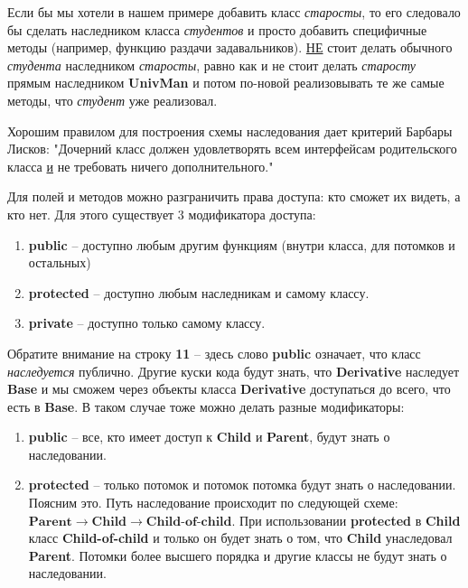 \begin{lecture}[\lectureSubject]
\begin{lecSection}
		Если бы мы хотели в нашем примере добавить класс \textit{старосты}, то его следовало бы сделать наследником класса \textit{студентов} и просто добавить специфичные методы (например, функцию раздачи задавальников). \underline{НЕ} стоит делать обычного \textit{студента} наследником \textit{старосты}, равно как и не стоит делать \textit{старосту} прямым наследником \textbf{UnivMan} и потом по-новой реализовывать те же самые методы, что \textit{студент} уже реализовал.
		
		Хорошим правилом для построения схемы наследования дает критерий Барбары Лисков: "Дочерний класс должен удовлетворять всем интерфейсам родительского класса \underline{и} не требовать ничего дополнительного."
	\end{lecSection}
	\begin{lecSection}
		Для полей и методов можно разграничить права доступа: кто сможет их видеть, а кто нет. Для этого существует 3 модификатора доступа:
		\begin{enumerate}
			\item \textbf{public} -- доступно любым другим функциям (внутри класса, для потомков и остальных)
			\item \textbf{protected} -- доступно любым наследникам и самому классу.
			\item \textbf{private} -- доступно только самому классу.
		\end{enumerate}
		Обратите внимание на строку \textbf{11} -- здесь слово \textbf{public} означает, что класс \textit{наследуется} публично. Другие куски кода будут знать, что \textbf{Derivative} наследует \textbf{Base} и мы сможем через объекты класса \textbf{Derivative} доступаться до всего, что есть в \textbf{Base}. В таком случае тоже можно делать разные модификаторы:
		\begin{enumerate}
			\item \textbf{public} -- все, кто имеет доступ к \textbf{Child} и \textbf{Parent}, будут знать о наследовании.
			\item \textbf{protected} -- только потомок и потомок потомка будут знать о наследовании. Поясним это. Путь наследование происходит по следующей схеме: $\textbf{Parent} \rightarrow \textbf{Child} \rightarrow \textbf{Child-of-child}$. При использовании \textbf{protected} в \textbf{Child} класс \textbf{Child-of-child} и только он будет знать о том, что \textbf{Child} унаследовал \textbf{Parent}. Потомки более высшего порядка и другие классы не будут знать о наследовании.

\end{enumerate}
\end{lecSection}
\end{lecture}
